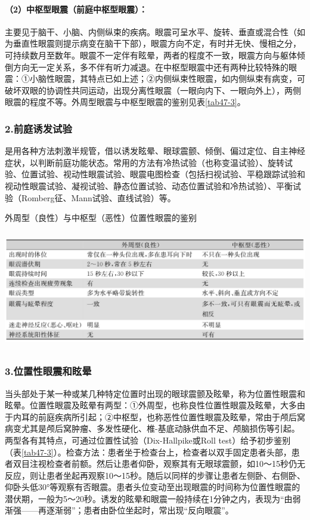 \paragraph{（2）中枢型眼震（前庭中枢型眼震）：}

主要见于脑干、小脑、内侧纵束的疾病。眼震可呈水平、旋转、垂直或混合性（如为垂直性眼震则提示病变在脑干下部），眼震方向不定，有时并无快、慢相之分，可持续数月至数年。眼震不一定伴有眩晕，两者的程度不一致，眼震方向与躯体倾倒方向无一定关系，多不伴有听力减退。在中枢型眼震中还有两种比较特殊的眼震：①小脑性眼震，其特点已如上述；②内侧纵束性眼震，如内侧纵束有病变，可破坏双眼的协调性共同运动，出现分离性眼震（一眼向内下、一眼向外上），两侧眼震的程度不等。外周型眼震与中枢型眼震的鉴别见表\ref{tab47-3}。

\subsubsection{2.前庭诱发试验}

是用各种方法刺激半规管，借以诱发眩晕、眼球震颤、倾倒、偏过定位、自主神经症状，以判断前庭功能状态。常用的方法有冷热试验（也称变温试验）、旋转试验、位置试验、视动性眼震试验、眼震电图检查（包括扫视试验、平稳跟踪试验和视动性眼震试验、凝视试验、静态位置试验、动态位置试验和冷热试验）、平衡试验（Romberg征、Mann试验、直线试验）等。

\begin{table}[htbp]
\centering
\caption{外周型（良性）与中枢型（恶性）位置性眼震的鉴别}
\label{tab47-3}
\includegraphics[width=5.88542in,height=2.02083in]{./images/Image00298.jpg}
\end{table}

\subsubsection{3.位置性眼震和眩晕}

当头部处于某一种或某几种特定位置时出现的眼球震颤及眩晕，称为位置性眼震和眩晕。位置性眼震及眩晕有两型：①外周型，也称良性位置性眼震及眩晕，大多由于内耳的前庭疾病所引起；②中枢型，也称恶性位置性眼震及眩晕，常由于颅后窝病变尤其是颅后窝肿瘤、多发性硬化、椎-基底动脉供血不足、颅脑损伤等引起。两型各有其特点，可通过位置性试验（Dix-Hallpike或Roll
test）给予初步鉴别（表\ref{tab47-3}）。检查方法：患者坐于检查台上，检查者以双手固定患者头部，患者双目注视检查者前额。然后让患者仰卧，观察其有无眼球震颤，如10～15秒仍无反应，则让患者坐起再观察10～15秒。随后以同样的步骤让患者左侧卧、右侧卧、仰卧头低30°等观察有否眼震。患者头位变动至出现眼震的时间称为位置性眼震的潜伏期，一般为5～20秒。诱发的眩晕和眼震一般持续在1分钟之内，表现为“由弱渐强------再逐渐弱”；患者由卧位坐起时，常出现“反向眼震”。

